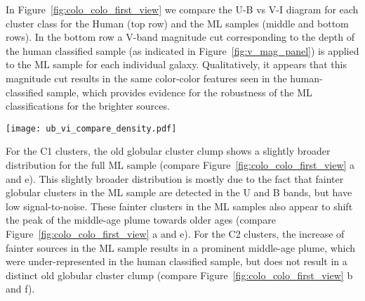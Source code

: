 \documentclass[linenumbers]{aastex63}
\begin{document}
{In Figure~\ref{fig:colo_colo_first_view} we compare the U-B vs V-I diagram for each cluster class for the Human (top row) and the ML samples (middle and bottom rows).
In the bottom row a V-band magnitude cut corresponding to the depth of the human classified sample (as indicated in Figure~\ref{fig:v_mag_panel}) is applied to the ML sample for each individual galaxy. Qualitatively, it appears that this magnitude cut results in the same color-color features seen in the human-classified sample, which provides evidence for the robustness of the ML classifications for the brighter sources. 
%
\begin{figure*} 
\texttt{[image: ub\_vi\_compare\_density.pdf]}
 \caption{Color-color diagrams for the Human cluster sample (top row) and the ML cluster sample (middle and bottom rows). In the middle row we show all ML classified clusters, whereas the bottom row only shows ML classified clusters up to the same V-band magnitude for each target as detected for the human sample. The individual V-band cuts are estimated with the maximal detected magnitude as presented in Figure~\ref{fig:v_mag_panel}. Cluster classes 1, 2, 1+2 and class 3 compact associations are shown individually in each column from left to right, respectively. Clusters are represented by black dots and in crowded regions by a Gaussian-smoothed heat map indicating the relative density.}
 \label{fig:colo_colo_first_view}
\end{figure*}
%


For the C1 clusters, the old globular cluster clump shows a slightly broader distribution for the full ML sample (compare Figure~\ref{fig:colo_colo_first_view} a and e). This slightly broader distribution is mostly due to the fact that fainter globular clusters in the ML sample are detected in the U and B bands, but have low signal-to-noise. %
These fainter clusters in the ML samples also appear to shift the peak of the middle-age plume towards older ages (compare Figure~\ref{fig:colo_colo_first_view} a and e).   For the C2 clusters, the increase of fainter sources in the ML sample results in a prominent middle-age plume, which were under-represented in the human classified sample, but does not result in a distinct old globular cluster clump (compare Figure~\ref{fig:colo_colo_first_view} b and f).

}
\end{document}

